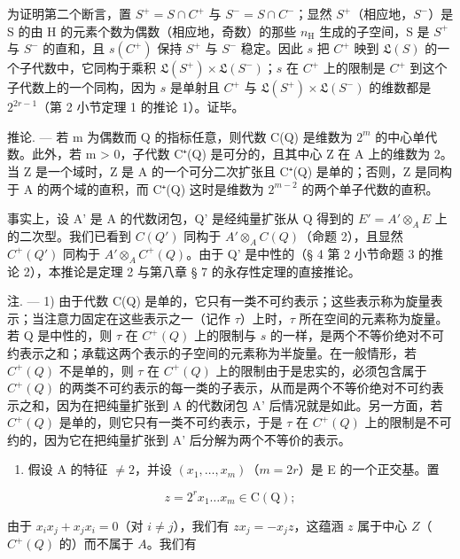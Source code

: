   为证明第二个断言，置 \(S^{+} = S \cap C^{+}\) 与 \(S^{-} = S \cap C^{-}\)；显然 \(S^{+}\)（相应地，\(S^{-}\)）是 S 的由 H 的元素个数为偶数（相应地，奇数）的那些 \(n_{\mathrm{H}}\) 生成的子空间，S 是 \(S^{+}\) 与 \(S^{-}\) 的直和，且 \(s(C^{+})\) 保持 \(S^{+}\) 与 \(S^{-}\) 稳定。因此 \(s\) 把 \(C^{+}\) 映到 \(\mathfrak{L}(S)\) 的一个子代数中，它同构于乘积 \(\mathfrak{L}(S^{+}) \times \mathfrak{L}(S^{-})\)；\(s\) 在 \(C^{+}\) 上的限制是 \(C^{+}\) 到这个子代数上的一个同构，因为 \(s\) 是单射且 \(C^{+}\) 与 \(\mathfrak{L}(S^{+}) \times \mathfrak{L}(S^{-})\) 的维数都是 \(2^{2r-1}\)（第 2 小节定理 1 的推论 1）。证毕。

推论. --- 若 m 为偶数而 Q 的指标任意，则代数 C(Q) 是维数为 \(2^{m}\) 的中心单代数。此外，若 m \textgreater{} 0，子代数 C⁺(Q) 是可分的，且其中心 Z 在 A 上的维数为 2。当 Z 是一个域时，Z 是 A 的一个可分二次扩张且 C⁺(Q) 是单的；否则，Z 是同构于 A 的两个域的直积，而 C⁺(Q) 这时是维数为 \(2^{m-2}\) 的两个单子代数的直积。

  事实上，设 A' 是 A 的代数闭包，Q' 是经纯量扩张从 Q 得到的 \(E' = A' \otimes_{A} E\) 上的二次型。我们已看到 \(C(Q')\) 同构于 \(A' \otimes_{A} C(Q)\)（命题 2），且显然 \(C^{+}(Q')\) 同构于 \(A' \otimes_{A} C^{+}(Q)\)。由于 Q' 是中性的（§ 4 第 2 小节命题 3 的推论 2），本推论是定理 2 与第八章 § 7 的永存性定理的直接推论。

注. --- 1) 由于代数 C(Q) 是单的，它只有一类不可约表示；这些表示称为旋量表示；当注意力固定在这些表示之一（记作 \(\tau\)）上时，\(\tau\) 所在空间的元素称为旋量。若 Q 是中性的，则 \(\tau\) 在 \(C^{+}(Q)\) 上的限制与 \(s\) 的一样，是两个不等价绝对不可约表示之和；承载这两个表示的子空间的元素称为半旋量。在一般情形，若 \(C^{+}(Q)\) 不是单的，则 \(\tau\) 在 \(C^{+}(Q)\) 上的限制由于是忠实的，必须包含属于 \(C^{+}(Q)\) 的两类不可约表示的每一类的子表示，从而是两个不等价绝对不可约表示之和，因为在把纯量扩张到 A 的代数闭包 A' 后情况就是如此。另一方面，若 \(C^{+}(Q)\) 是单的，则它只有一类不可约表示，于是 \(\tau\) 在 \(C^{+}(Q)\) 上的限制是不可约的，因为它在把纯量扩张到 A' 后分解为两个不等价的表示。

\begin{enumerate}
\def\labelenumi{\arabic{enumi})}
\setcounter{enumi}{1}
\tightlist
\item
  假设 A 的特征 \(\neq 2\)，并设 \((x_{1},\ldots,x_{m})\)（\(m=2r\)）是 E 的一个正交基。置
\end{enumerate}

\[
z = 2 ^ {r} x _ {1} \dots x _ {m} \in \mathrm{C(Q)};
\]

  由于 \(x_{i}x_{j} + x_{j}x_{i} = 0\)（对 \(i \neq j\)），我们有 \(zx_{j} = -x_{j}z\)，这蕴涵 \(z\) 属于中心 \(Z\)（\(C^{+}(Q)\) 的）而不属于 \(A\)。我们有

